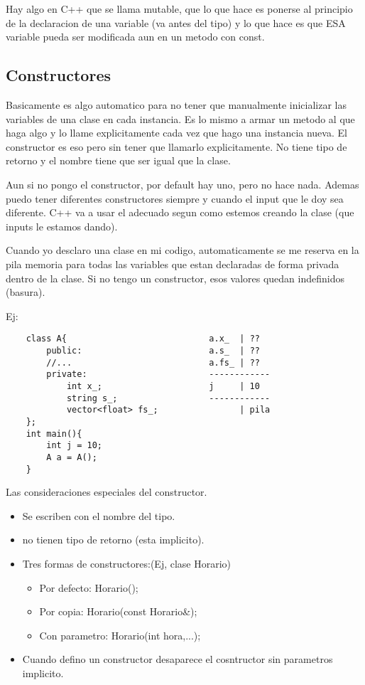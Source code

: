 \documentclass[11pt]{article}
\begin{document}
Hay algo en C++ que se llama mutable, que lo que hace es ponerse al principio de
la declaracion de una variable (va antes del tipo) y lo que hace es que ESA variable
pueda ser modificada aun en un metodo con const.




\subsection{Constructores}
Basicamente es algo automatico para no tener que manualmente inicializar las
variables de una clase en cada instancia.
Es lo mismo a armar un metodo al que haga algo y lo llame explicitamente cada
vez que hago una instancia nueva.
El constructor es eso pero sin tener que llamarlo explicitamente.
No tiene tipo de retorno y el nombre tiene que ser igual que la clase.

Aun si no pongo el constructor, por default hay uno, pero no hace nada.
Ademas puedo tener diferentes constructores siempre y cuando el input que le
doy sea diferente.
C++ va a usar el adecuado segun como estemos creando la clase (que inputs le
estamos dando).

Cuando yo desclaro una clase en mi codigo, automaticamente se me reserva en la pila
memoria para todas las variables que estan declaradas de forma privada dentro de
la clase.
Si no tengo un constructor, esos valores quedan indefinidos (basura).

Ej:

\begin{lstlisting}
    class A{                            a.x_  | ??
        public:                         a.s_  | ??
        //...                           a.fs_ | ??
        private:                        ------------
            int x_;                     j     | 10
            string s_;                  ------------
            vector<float> fs_;                | pila
    };
    int main(){
        int j = 10;
        A a = A();
    }
\end{lstlisting}
Las consideraciones especiales del constructor.
\begin{itemize}
    \item Se escriben con el nombre del tipo.
    \item no tienen tipo de retorno (esta implicito).
    \item Tres formas de constructores:(Ej, clase Horario)
        \begin{itemize}
            \item Por defecto: Horario();
            \item Por copia: Horario(const Horario\&);
            \item Con parametro: Horario(int hora,...);
        \end{itemize}
    \item Cuando defino un constructor desaparece el cosntructor sin parametros
            implicito.
\end{itemize}
\end{document}
